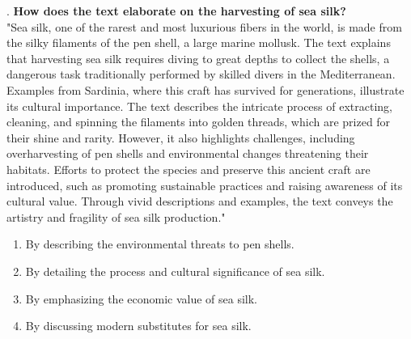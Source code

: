 \documentclass[12pt]{article}
\begin{document}
\vspace{1cm}
. \textbf{How does the text elaborate on the harvesting of sea silk?\\}
"Sea silk, one of the rarest and most luxurious fibers in the world, is made from the silky filaments of the pen shell, a large marine mollusk. The text explains that harvesting sea silk requires diving to great depths to collect the shells, a dangerous task traditionally performed by skilled divers in the Mediterranean. Examples from Sardinia, where this craft has survived for generations, illustrate its cultural importance. The text describes the intricate process of extracting, cleaning, and spinning the filaments into golden threads, which are prized for their shine and rarity. However, it also highlights challenges, including overharvesting of pen shells and environmental changes threatening their habitats. Efforts to protect the species and preserve this ancient craft are introduced, such as promoting sustainable practices and raising awareness of its cultural value. Through vivid descriptions and examples, the text conveys the artistry and fragility of sea silk production."  
\begin{enumerate}[label=\Alph*.]
    \item By describing the environmental threats to pen shells.  
    \item By detailing the process and cultural significance of sea silk.  
    \item By emphasizing the economic value of sea silk.  
    \item By discussing modern substitutes for sea silk.  
\end{enumerate}
\end{document}
